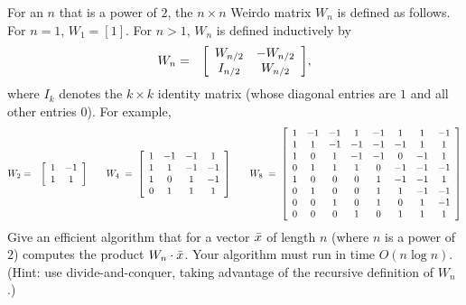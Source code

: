\documentclass{article}
\begin{document}
\begin{problem}
For an $n$ that is a power of $2$, the $n\times n$ Weirdo matrix $W_n$ is
defined as follows. For $n=1$, $W_1 = [1]$. For $n > 1$, $W_n$ is defined
inductively by
%
\begin{eqnarray*}
		W_n &=& {{\left[ \begin{array}{cc}  W_{n/2}  &  -W_{n/2}  \\  I_{n/2}  & W_{n/2} \end{array} \right] }},
\end{eqnarray*}
%
where $I_k$ denotes the $k\times k$ identity matrix (whose diagonal entries are $1$
and all other entries $0$). For example,
%
\begin{eqnarray*}
	W_2 &=& {\left[ \begin{array}{cc}
					1 & -1 \\
					1 & 1
				\end{array}
				 \right] }
\quad\quad
	W_4 \;=\; {\left[ \begin{array}{cccc}
					1 & -1 & -1 & 1 \\
					1 & 1  & -1 & -1 \\
					1 & 0 & 1 & -1 \\
					0 & 1 & 1 &  1
				\end{array}
				 \right] }
\quad\quad
	W_8 \;=\; {\left[ \begin{array}{cccccccc}
	1 & -1 & -1 & 1 & -1 & 1 & 1 & -1 \\
	1 & 1  & -1 & -1 & -1 & -1 & 1 & 1 \\
	1 & 0 & 1 & -1   & -1 & 0 & -1 & 1 \\
	0 & 1 & 1 &  1  & 0 & -1 & -1 & -1 \\
	1 & 0 & 0 & 0 & 1 & -1 & -1 & 1 \\
	0 & 1 & 0 & 0 & 1 & 1  & -1 & -1 \\
	0 & 0 & 1 & 0 & 1 & 0 & 1 & -1   \\
	0 & 0 & 0 & 1 & 0 & 1 & 1 &  1
	\end{array}
	 \right] }
\end{eqnarray*}
%
Give an efficient algorithm that for a vector ${\bar x}$ of length $n$ (where $n$
is a power
of $2$) computes the product $W_n\cdot {\bar x}$. Your algorithm must run in time
$O(n\log n)$. (Hint: use divide-and-conquer, taking advantage of the recursive
definition of $W_n$.)
\end{problem}
\end{document}
